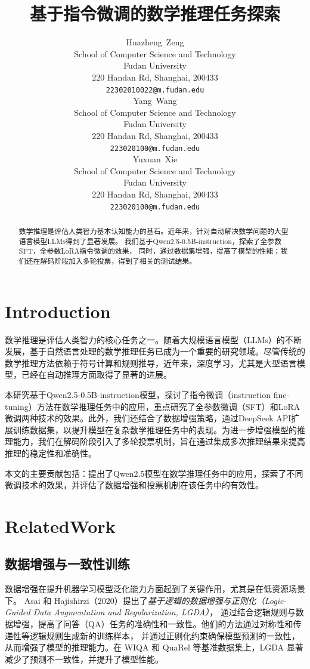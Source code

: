 \documentclass{article}
\title{基于指令微调的数学推理任务探索}
\author{
    Huazheng~Zeng\\
    School of Computer Science and Technology \\
    Fudan University \\
    220 Handan Rd, Shanghai, 200433 \\
    \texttt{22302010022@m.fudan.edu} \\
    \AND
    Yang~Wang\\
    School of Computer Science and Technology \\
    Fudan University \\
    220 Handan Rd, Shanghai, 200433 \\
    \texttt{223020100@m.fudan.edu} \\
    \AND
    Yuxuan~Xie\\
    School of Computer Science and Technology \\
    Fudan University \\
    220 Handan Rd, Shanghai, 200433 \\
    \texttt{223020100@m.fudan.edu} \\
}
\begin{document}
\maketitle


\begin{abstract}
  数学推理是评估人类智力基本认知能力的基石。近年来，针对自动解决数学问题的大型语言模型LLMs得到了显著发展。
  我们基于Qwen2.5-0.5B-instruction，探索了全参数SFT，全参数LoRA指令微调的效果，
  同时，通过数据集增强，提高了模型的性能；我们还在解码阶段加入多轮投票，得到了相关的测试结果。
\end{abstract}



\section{Introduction}

数学推理是评估人类智力的核心任务之一。随着大规模语言模型（LLMs）的不断发展，基于自然语言处理的数学推理任务已成为一个重要的研究领域。尽管传统的数学推理方法依赖于符号计算和规则推导，近年来，深度学习，尤其是大型语言模型，已经在自动推理方面取得了显著的进展。

本研究基于Qwen2.5-0.5B-instruction模型，探讨了指令微调（instruction fine-tuning）方法在数学推理任务中的应用，重点研究了全参数微调（SFT）和LoRA微调两种技术的效果。此外，我们还结合了数据增强策略，通过DeepSeek API扩展训练数据集，以提升模型在复杂数学推理任务中的表现。为进一步增强模型的推理能力，我们在解码阶段引入了多轮投票机制，旨在通过集成多次推理结果来提高推理的稳定性和准确性。

本文的主要贡献包括：提出了Qwen2.5模型在数学推理任务中的应用，探索了不同微调技术的效果，并评估了数据增强和投票机制在该任务中的有效性。






\section{RelatedWork}
\subsection{数据增强与一致性训练}
数据增强在提升机器学习模型泛化能力方面起到了关键作用，尤其是在低资源场景下。
Asai 和 Hajishirzi（2020）提出了\textit{基于逻辑的数据增强与正则化（Logic-Guided Data Augmentation and Regularization, LGDA）}，
通过结合逻辑规则与数据增强，提高了问答（QA）任务的准确性和一致性。他们的方法通过对称性和传递性等逻辑规则生成新的训练样本，
并通过正则化约束确保模型预测的一致性，从而增强了模型的推理能力。在 WIQA 和 QuaRel 等基准数据集上，LGDA 显著减少了预测不一致性，并提升了模型性能。
\end{document}
